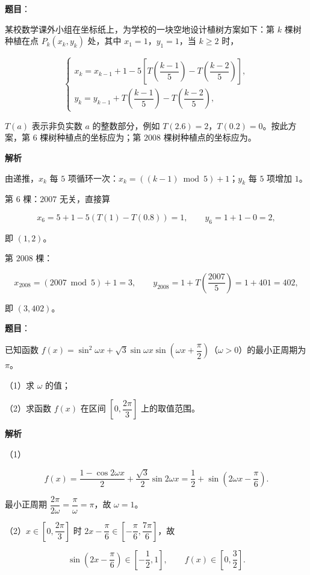 \begin{answer}

\textbf{题目}：

某校数学课外小组在坐标纸上，为学校的一块空地设计植树方案如下：第 $k$ 棵树种植在点 $P_k(x_k,y_k)$ 处，其中 $x_1=1$，$y_1=1$，当 $k\geqslant2$ 时，

\nopagebreak[4]
\[\begin{cases}x_k=x_{k-1}+1-5\left[T\left(\dfrac{k-1}5\right)-T\left(\dfrac{k-2}5\right)\right],\\ y_k=y_{k-1}+T\left(\dfrac{k-1}5\right)-T\left(\dfrac{k-2}5\right),\end{cases}\]

$T(a)$ 表示非负实数 $a$ 的整数部分，例如 $T(2.6)=2$，$T(0.2)=0$。按此方案，第 $6$ 棵树种植点的坐标应为\gkblank{}；第 $2008$ 棵树种植点的坐标应为\gkblank{}。

\textbf{解析}

由递推，$x_k$ 每 $5$ 项循环一次：$x_k=((k-1)\bmod5)+1$；$y_k$ 每 $5$ 项增加 $1$。

第 $6$ 棵：$2007$ 无关，直接算

\nopagebreak[4]
\[x_6=5+1-5(T(1)-T(0.8))=1,\qquad y_6=1+1-0=2,\]

即 $(1,2)$。

第 $2008$ 棵：

\nopagebreak[4]
\[x_{2008}=(2007\bmod5)+1=3,\qquad y_{2008}=1+T\left(\frac{2007}5\right)=1+401=402,\]

即 $(3,402)$。


\end{answer}
\begin{answer}

\textbf{题目}：

已知函数 $f(x)=\sin^2\omega x+\sqrt3\sin\omega x\sin\left(\omega x+\dfrac{\pi}2\right)$（$\omega>0$）的最小正周期为 $\pi$。

（1）求 $\omega$ 的值；

（2）求函数 $f(x)$ 在区间 $\left[0,\dfrac{2\pi}3\right]$ 上的取值范围。

\textbf{解析}

（1）

\nopagebreak[4]
\[f(x)=\frac{1-\cos2\omega x}2+\frac{\sqrt3}2\sin2\omega x=\frac12+\sin\left(2\omega x-\frac{\pi}6\right).\]

最小正周期 $\dfrac{2\pi}{2\omega}=\dfrac{\pi}\omega=\pi$，故 $\omega=1$。

（2）$x\in\left[0,\dfrac{2\pi}3\right]$ 时 $2x-\dfrac{\pi}6\in\left[-\dfrac{\pi}6,\dfrac{7\pi}6\right]$，故

\nopagebreak[4]
\[\sin\left(2x-\frac{\pi}6\right)\in\left[-\frac12,1\right],\qquad f(x)\in\left[0,\frac32\right].\]


\end{answer}
